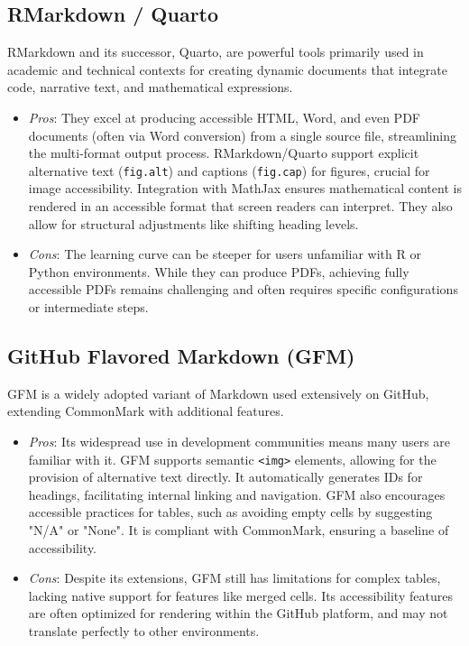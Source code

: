 \subsection{RMarkdown / Quarto}
RMarkdown and its successor, Quarto, are powerful tools primarily used in academic and technical contexts for creating dynamic documents that integrate code, narrative text, and mathematical expressions. \cite{RMarkdownMassey, QuartoCommonMark}
\begin{itemize}
    \item \emph{Pros}: They excel at producing accessible HTML, Word, and even PDF documents (often via Word conversion) from a single source file, streamlining the multi-format output process. \cite{QuartoCommonMark, AccessR} RMarkdown/Quarto support explicit alternative text (\texttt{fig.alt}) and captions (\texttt{fig.cap}) for figures, crucial for image accessibility. \cite{RMarkdownMassey, AccessR} Integration with MathJax ensures mathematical content is rendered in an accessible format that screen readers can interpret. \cite{CreateUW, RMarkdownMassey} They also allow for structural adjustments like shifting heading levels. \cite{QuartoCommonMark}
    \item \emph{Cons}: The learning curve can be steeper for users unfamiliar with R or Python environments. While they can produce PDFs, achieving fully accessible PDFs remains challenging and often requires specific configurations or intermediate steps. \cite{CreateUW, QuartoCommonMark}
\end{itemize}

\subsection{GitHub Flavored Markdown (GFM)}
GFM is a widely adopted variant of Markdown used extensively on GitHub, extending CommonMark with additional features. \cite{GitHubDocs}
\begin{itemize}
    \item \emph{Pros}: Its widespread use in development communities means many users are familiar with it. GFM supports semantic \texttt{<img>} elements, allowing for the provision of alternative text directly. \cite{GitHubDocs, TestPros} It automatically generates IDs for headings, facilitating internal linking and navigation. \cite{GitLabDocs} GFM also encourages accessible practices for tables, such as avoiding empty cells by suggesting "N/A" or "None". \cite{GitLabDocs} It is compliant with CommonMark, ensuring a baseline of accessibility. \cite{GitHubDocs}
    \item \emph{Cons}: Despite its extensions, GFM still has limitations for complex tables, lacking native support for features like merged cells. \cite{DocsToMarkdown} Its accessibility features are often optimized for rendering within the GitHub platform, and may not translate perfectly to other environments.
\end{itemize}

